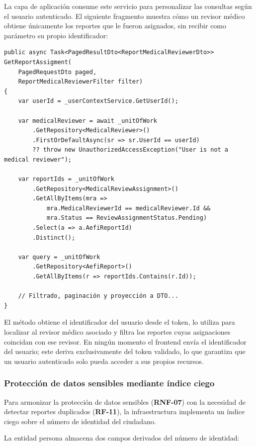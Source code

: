La capa de aplicación consume este servicio para personalizar las consultas según el usuario autenticado. 
El siguiente fragmento muestra cómo un revisor médico obtiene únicamente los reportes que le fueron asignados, sin recibir como parámetro su propio identificador:

\begin{lstlisting}[language={[Sharp]C}, caption={Uso de UserContextService en la capa de aplicación}, label={lst:usercontextusage}]
public async Task<PagedResultDto<ReportMedicalReviewerDto>> GetReportAssigment(
    PagedRequestDto paged,
    ReportMedicalReviewerFilter filter)
{
    var userId = _userContextService.GetUserId();

    var medicalReviewer = await _unitOfWork
        .GetRepository<MedicalReviewer>()
        .FirstOrDefaultAsync(sr => sr.UserId == userId)
        ?? throw new UnauthorizedAccessException("User is not a medical reviewer");

    var reportIds = _unitOfWork
        .GetRepository<MedicalReviewAssignment>()
        .GetAllByItems(mra =>
            mra.MedicalReviewerId == medicalReviewer.Id &&
            mra.Status == ReviewAssignmentStatus.Pending)
        .Select(a => a.AefiReportId)
        .Distinct();

    var query = _unitOfWork
        .GetRepository<AefiReport>()
        .GetAllByItems(r => reportIds.Contains(r.Id));

    // Filtrado, paginación y proyección a DTO...
}
\end{lstlisting}

El método obtiene el identificador del usuario desde el token, lo utiliza para localizar al revisor médico asociado y filtra los reportes cuyas asignaciones coincidan con ese revisor. 
En ningún momento el frontend envía el identificador del usuario; este deriva exclusivamente del token validado, lo que garantiza que un usuario autenticado solo pueda acceder a sus propios recursos.

\subsubsection{Protección de datos sensibles mediante índice ciego}

Para armonizar la protección de datos sensibles (\textbf{RNF-07}) con la necesidad de detectar reportes duplicados (\textbf{RF-11}), la infraestructura implementa un índice ciego sobre el número de identidad del ciudadano.

La entidad persona almacena dos campos derivados del número de identidad:

